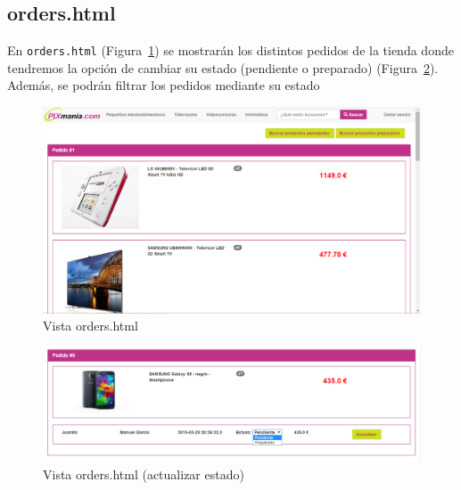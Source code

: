 \documentclass[12pt,a4paper,svgnames]{article}
\begin{document}
\clearpage

\subsection{orders.html}
En \texttt{orders.html} (Figura~\ref{fig:orders}) se mostrarán los distintos pedidos de la tienda donde tendremos la opción de cambiar su estado (pendiente o preparado) (Figura~\ref{fig:orders_actualizar_estado}). Además, se podrán filtrar los pedidos mediante su estado

\begin{figure}[htbp]
	\centering
	\includegraphics[width=1\linewidth]{imagenes/orders}
	\caption{Vista orders.html}
	\label{fig:orders}
\end{figure}

\begin{figure}[htbp]
	\centering
	\includegraphics[width=1\linewidth]{imagenes/orders_actualizar_estado}
	\caption{Vista orders.html (actualizar estado)}
	\label{fig:orders_actualizar_estado}
\end{figure}
\end{document}
